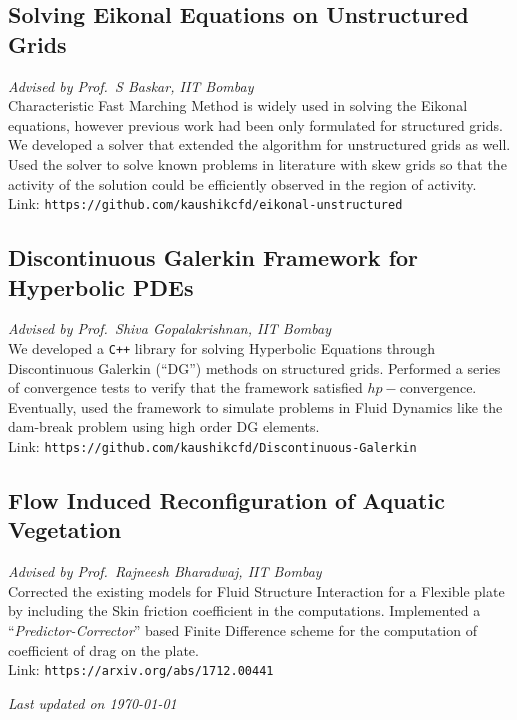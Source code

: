 \documentclass[letterpaper, 13pt]{article}
\newcommand{\updatenote}[1][\today]{\par\vfill{\scriptsize \textit{Last updated on #1}}}
\begin{document}
\subsection*{Solving Eikonal Equations on Unstructured Grids}
\vspace{-1ex}
\small \textit{Advised by Prof.~S Baskar, IIT Bombay}\\
Characteristic Fast Marching Method is widely used in solving the Eikonal
equations, however previous work had been only formulated for structured
grids. We developed a solver that extended the algorithm for
unstructured grids as well. Used the solver to solve known problems in
literature with skew grids so that the activity of the solution could be
efficiently observed in the region of activity.\\
Link: \texttt{https://github.com/kaushikcfd/eikonal-unstructured}


\subsection*{Discontinuous Galerkin Framework for Hyperbolic PDEs}
\vspace{-1ex}
\small \textit{Advised by Prof.~Shiva Gopalakrishnan, IIT Bombay}\\
We developed a \texttt{C++} library for solving Hyperbolic Equations through
Discontinuous Galerkin (``DG'') methods on structured grids.  Performed a
series of convergence tests to verify that the framework satisfied
$hp-$convergence.
Eventually, used the framework to simulate problems in Fluid Dynamics like the
dam-break problem using high order DG elements.\\
Link: \texttt{https://github.com/kaushikcfd/Discontinuous-Galerkin}


\subsection*{Flow Induced Reconfiguration of Aquatic Vegetation}
\vspace{-1ex}
\small \textit{Advised by Prof.~Rajneesh Bharadwaj, IIT Bombay}\\
Corrected the existing models for Fluid Structure Interaction for a Flexible
plate by including the Skin friction coefficient in the computations.
Implemented a ``\textit{Predictor-Corrector}'' based Finite Difference scheme
for the computation of coefficient of drag on the plate.\\
Link: \texttt{https://arxiv.org/abs/1712.00441}


\updatenote{}
\end{document}
